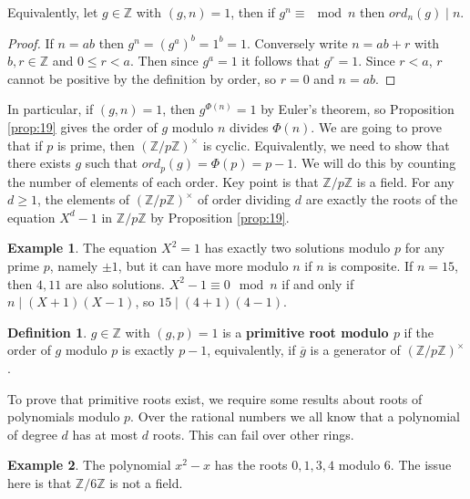 \documentclass{article}
\newcommand{\Z}{\mathbb{Z}}
\newcommand{\rb}[1]{\left( #1 \right)}
\newcommand{\unit}[1]{\rb{\Z / #1\Z}^\times}
\theoremstyle{definition}\newtheorem{definition}{Definition}
\theoremstyle{definition}\newtheorem*{remark}{Remark}
\theoremstyle{definition}\newtheorem*{example}{Example}
\theoremstyle{definition}\newtheorem*{note}{Note}
\begin{document}
Equivalently, let $ g \in \Z $ with $ \rb{g, n} = 1 $, then if $ g^n \equiv \mod n $ then $ ord_n\rb{g} \mid n $.

\begin{proof}
If $ n = ab $ then $ g^n = \rb{g^a}^b = 1^b = 1 $. Conversely write $ n = ab + r $ with $ b, r \in \Z $ and $ 0 \le r < a $. Then since $ g^a = 1 $ it follows that $ g^r = 1 $. Since $ r < a $, $ r $ cannot be positive by the definition by order, so $ r = 0 $ and $ n = ab $.
\end{proof}

In particular, if $ \rb{g, n} = 1 $, then $ g^{\Phi\rb{n}} = 1 $ by Euler's theorem, so Proposition \ref{prop:19} gives the order of $ g $ modulo $ n $ divides $ \Phi\rb{n} $. We are going to prove that if $ p $ is prime, then $ \unit{p} $ is cyclic. Equivalently, we need to show that there exists $ g $ such that $ ord_p\rb{g} = \Phi\rb{p} = p - 1 $. We will do this by counting the number of elements of each order. Key point is that $ \Z / p\Z $ is a field. For any $ d \ge 1 $, the elements of $ \unit{p} $ of order dividing $ d $ are exactly the roots of the equation $ X^d - 1 $ in $ \Z / p\Z $ by Proposition \ref{prop:19}.

\begin{example}
The equation $ X^2 = 1 $ has exactly two solutions modulo $ p $ for any prime $ p $, namely $ \pm 1 $, but it can have more modulo $ n $ if $ n $ is composite. If $ n = 15 $, then $ 4, 11 $ are also solutions. $ X^2 - 1 \equiv 0 \mod n $ if and only if $ n \mid \rb{X + 1}\rb{X - 1} $, so $ 15 \mid \rb{4 + 1}\rb{4 - 1} $.
\end{example}

\begin{definition}
$ g \in \Z $ with $ \rb{g, p} = 1 $ is a \textbf{primitive root modulo $ p $} if the order of $ g $ modulo $ p $ is exactly $ p - 1 $, equivalently, if $ \overline{g} $ is a generator of $ \unit{p} $.
\end{definition}

To prove that primitive roots exist, we require some results about roots of polynomials modulo $ p $. Over the rational numbers we all know that a polynomial of degree $ d $ has at most $ d $ roots. This can fail over other rings.

\begin{example}
The polynomial $ x^2 - x $ has the roots $ 0, 1, 3, 4 $ modulo $ 6 $. The issue here is that $ \Z / 6\Z $ is not a field.
\end{example}
\end{document}
